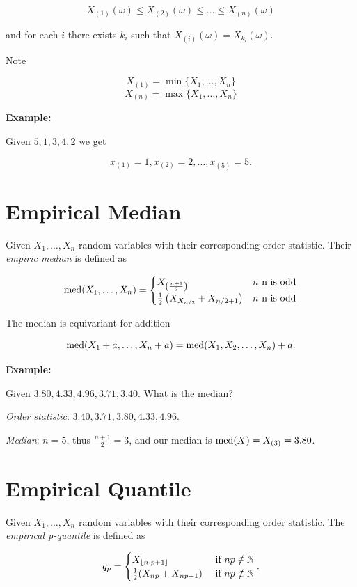 \[
    X_{(1)} (\omega) \le X_{(2)} (\omega) \le \dots \le X_{(n)} (\omega)
\]

and for each \(i\) there exists \(k_i\) such that \(X_(i)(\omega) = X_{k_i}(\omega)\).

Note

\[
    X_{(1)} = \min \{X_1, \dots, X_n\}
\]
\[
    X_{(n)} = \max \{X_1, \dots, X_n\}
\]

\textbf{Example:}

Given \(5,1,3,4,2\) we get 

\[
    x_{(1)} = 1, x_{(2)} = 2, \dots, x_{(5)} = 5.
\]

\section{Empirical Median}

Given \(X_1, \dots, X_n\) random variables with their corresponding order statistic. 
Their \emph{empiric median} is defined as 

\[
    \mathrm{med} (X_1, \dots, X_n) = 
    \begin{cases}
        X_{\left(\frac{n + 1}{2}\right)} & n \text{ n is odd} \\ 
        \frac{1}{2} \left(X_{X_{n / 2}} + X_{n /2 + 1}\right) & n \text{ n is odd} \\ 
    \end{cases}
\]

The median is equivariant for addition

\[
    \mathrm{med}(X_1 + a, \dots, X_n + a) = \mathrm{med}(X_1, X_2, \dots, X_n) + a.
\]

\textbf{Example:}

Given \(3.80, 4.33, 4.96, 3.71, 3.40\). What is the median?

\emph{Order statistic}: \(3.40, 3.71, 3.80, 4.33, 4.96\).

\emph{Median}: \(n = 5\), thus \(\frac{n + 1}{2} = 3\), and our median is \(\mathrm{med}(X) = X_{(3)} = 3.80\).

\section{Empirical Quantile}

Given \(X_1, \dots, X_n\) random variables with their corresponding order statistic. 
The \emph{empirical p-quantile} is defined as 

\[
    q_p = 
    \begin{cases}
    X_{ \left\lfloor  n\cdot p + 1 \right\rfloor}  & \text{ if } np \notin \mathbb{N} \\
    \frac{1}{2} (X_{np} + X_{np + 1})  & \text{ if } np \notin \mathbb{N} 
    \end{cases}.
\]

